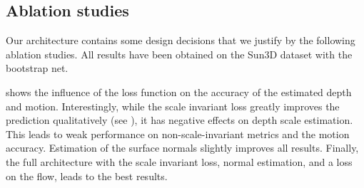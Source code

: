 \documentclass[10pt,twocolumn,letterpaper]{article}
\begin{document}
\begin{table}
   \begin{center}
   \end{center}
\vspace{\capvspace}%
\vspace{0.2em}%
   \caption{%
   Quantitative generalization performance on previously unseen scenes, objects, and camera rotations, 
using a self-recorded and reconstructed dataset. 
Errors after optimal log-scaling. The best model of Eigen et al. \cite{eigen_predicting_2015} for this task is based on VGG, for Liu et al. \cite{liu_learning_2015}, the model trained on Make3D \cite{make3d_2009} performed best. DeMoN achieved best performance after two iterations.
   }%
   \label{tbl:generalization}
\vspace{\figvspace}
\vspace{-0.4em}
 \end{table}






\subsection{Ablation studies}
\label{sec:ablation_study}
Our architecture contains some design decisions that we justify by the following ablation studies. 
All results have been obtained on the Sun3D dataset with the bootstrap net.


 shows the influence of the loss function on the accuracy of the estimated depth and motion. Interestingly, while the scale invariant loss greatly improves the prediction qualitatively (see ), it has negative effects on depth scale estimation. 
This leads to weak performance on non-scale-invariant metrics and the motion accuracy. 
Estimation of the surface normals slightly improves all results.
Finally, the full architecture with the scale invariant loss, normal estimation, and a loss on the flow, leads to the best results. 
\end{document}
